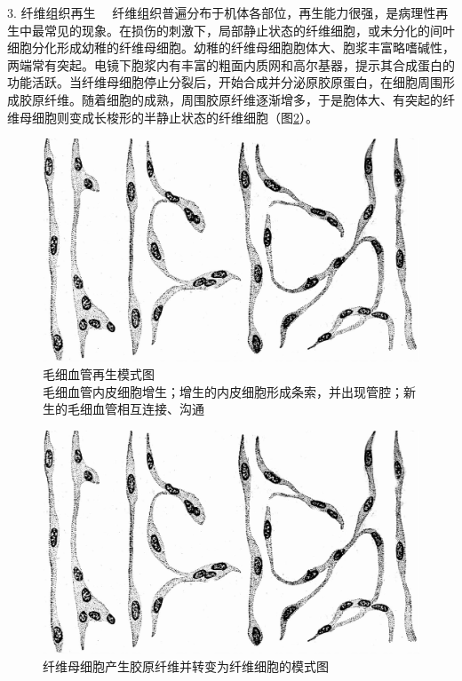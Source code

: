 {3. 纤维组织再生}
　纤维组织普遍分布于机体各部位，再生能力很强，是病理性再生中最常见的现象。在损伤的刺激下，局部静止状态的纤维细胞，或未分化的间叶细胞分化形成幼稚的纤维母细胞。幼稚的纤维母细胞胞体大、胞浆丰富略嗜碱性，两端常有突起。电镜下胞浆内有丰富的粗面内质网和高尔基器，提示其合成蛋白的功能活跃。当纤维母细胞停止分裂后，开始合成并分泌原胶原蛋白，在细胞周围形成胶原纤维。随着细胞的成熟，周围胶原纤维逐渐增多，于是胞体大、有突起的纤维母细胞则变成长梭形的半静止状态的纤维细胞（图\ref{fig2-2}）。
\begin{figure}[!h]
	\begin{center}
        \includegraphics{./images/Image00024.jpg}
    \end{center}
    \captionsetup{justification=centering}
	\caption{毛细血管再生模式图 \\ {\small 毛细血管内皮细胞增生；增生的内皮细胞形成条索，并出现管腔；新生的毛细血管相互连接、沟通}}
	\label{fig2-1} 
	\end{figure} 


\begin{figure}[!h]
	\begin{center}
        \includegraphics{./images/Image00024.jpg}
    \end{center}
    \captionsetup{justification=centering}
	\caption{纤维母细胞产生胶原纤维并转变为纤维细胞的模式图}
	\label{fig2-2} 
	\end{figure} 

